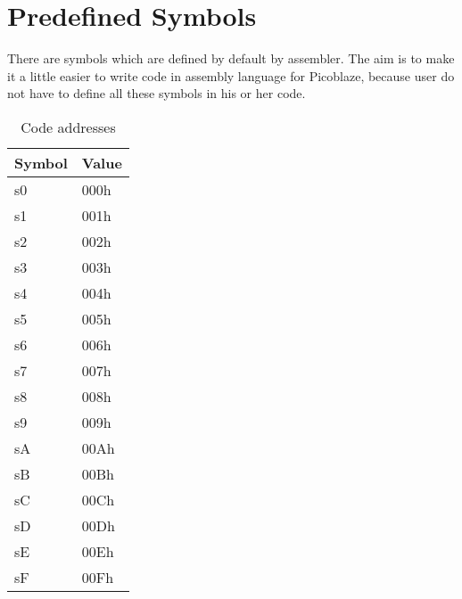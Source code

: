                 \section{Predefined Symbols}
        There are symbols which are defined by default by assembler. The aim is to
        make it a little easier to write code in assembly language for Picoblaze,
        because user do not have to define all these symbols in his or her code.
                \begin{table}[h!]
                        \centering{}
                        \mysmallfont{}
                        \caption{Code addresses}
                        \begin{tabular}{|ll|}
                                \hline
                            \textbf{Symbol} & \textbf{Value} \\
                                \hline
                                s0      & 000h \\\hline
                                s1      & 001h  \\\hline
                               s2      & 002h \\\hline
                               s3      & 003h  \\\hline
                               s4      & 004h \\\hline
                               s5      & 005h  \\\hline
                               s6      & 006h \\\hline
                               s7      & 007h  \\\hline
                               s8      & 008h \\\hline
                               s9      & 009h  \\\hline
                               sA      & 00Ah \\\hline
                               sB      & 00Bh  \\\hline
                               sC      & 00Ch \\\hline
                               sD      & 00Dh  \\\hline
                               sE      & 00Eh \\\hline
                               sF      & 00Fh  \\\hline
                                \hline
                        \end{tabular}
                \end{table}


